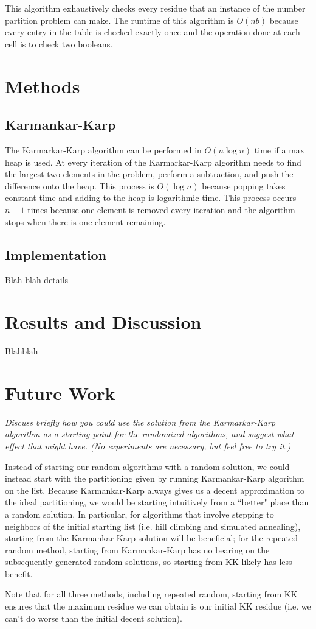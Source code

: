 \documentclass[a4paper]{article}
\begin{document}
	This algorithm exhaustively checks every residue that an instance of the number partition problem can make. The runtime of this algorithm is $O(nb)$ because every entry in the table is checked exactly once and the operation done at each cell is to check two booleans.
	
	\section{Methods}
	\subsection{Karmankar-Karp}
	The Karmarkar-Karp algorithm can be performed in $O(n\log n)$ time if a max heap is used. At every iteration of the Karmarkar-Karp algorithm needs to find the largest two elements in the problem, perform a subtraction, and push the difference onto the heap. This process is $O(\log n)$ because popping takes constant time and adding to the heap is logarithmic time. This process occurs $n-1$ times because one element is removed every iteration and the algorithm stops when there is one element remaining.
	\subsection{Implementation}
	Blah blah details
	
	\section{Results and Discussion}
	Blahblah
	
	\section{Future Work}
	\textit{Discuss briefly how you could use the solution from the Karmarkar-Karp algorithm as a starting point for the randomized algorithms, and suggest what effect that might have. (No experiments are necessary, but feel free to try it.)}
	
	Instead of starting our random algorithms with a random solution, we could instead start with the partitioning given by running Karmankar-Karp algorithm on the list. Because Karmankar-Karp always gives us a decent approximation to the ideal partitioning, we would be starting intuitively from a ``better" place than a random solution. In particular, for algorithms that involve stepping to neighbors of the initial starting list (i.e. hill climbing and simulated annealing), starting from the Karmankar-Karp solution will be beneficial; for the repeated random method, starting from Karmankar-Karp has no bearing on the subsequently-generated random solutions, so starting from KK likely has less benefit.
	
	Note that for all three methods, including repeated random, starting from KK ensures that the maximum residue we can obtain is our initial KK residue (i.e. we can't do worse than the initial decent solution).
	
\end{document}
